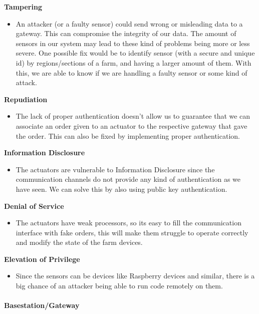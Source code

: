 \textbf{Tampering}

\begin{itemize}
    \item An attacker (or a faulty sensor) could send wrong or misleading data to a gateway. This can compromise the integrity of our data. The amount of sensors in our system may lead to these kind of problems being more or less severe. One possible fix would be to identify sensor (with a secure and unique id) by regions/sections of a farm, and having a larger amount of them. With this, we are able to know if we are handling a faulty sensor or some kind of attack.
\end{itemize}

\textbf{Repudiation}
\begin{itemize}
    \item The lack of proper authentication doesn't allow us to guarantee that we can associate an order given to an actuator to the respective gateway that gave the order. This can also be fixed by implementing proper authentication.
\end{itemize}

\textbf{Information Disclosure}

\begin{itemize}
    \item The actuators are vulnerable to Information Disclosure since the communication channels do not provide any kind of authentication as we have seen. We can solve this by also using public key authentication.
\end{itemize}

\textbf{Denial of Service}
\begin{itemize}
    \item The actuators have weak processors, so its easy to fill the communication interface with fake orders, this will make them struggle to operate correctly and modify the state of the farm devices.
\end{itemize}

\textbf{Elevation of Privilege}
\begin{itemize}
    \item Since the sensors can be devices like Raspberry devices and similar, there is a big chance of an attacker being able to run code remotely on them.
\end{itemize}

\paragraph{Basestation/Gateway}\mbox{}

